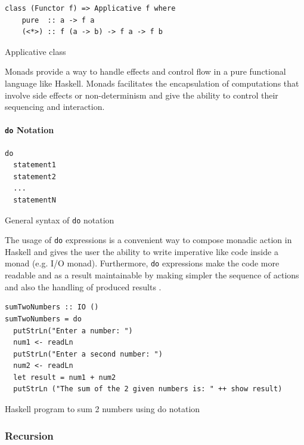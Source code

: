 \documentclass[a4paper, titlepage, twoside]{article}
\begin{document}
\begin{listing}[htbp]
\begin{verbatim}
class (Functor f) => Applicative f where
    pure  :: a -> f a
    (<*>) :: f (a -> b) -> f a -> f b
\end{verbatim}
\caption{Applicative class \autocite[chapter 29.1.1]{wikibooksHaskellWikibooksFree2022}}
\end{listing}

Monads provide a way to handle effects and control flow in a pure functional language like Haskell. Monads facilitates the encapsulation of computations that involve side effects or non-determinism and give the ability to control their sequencing and interaction.

\paragraph*{\texttt{do} Notation}
\label{sec:org20db2ad}

\begin{listing}[htbp]
\begin{verbatim}
do
  statement1
  statement2
  ...
  statementN
\end{verbatim}
\caption{General syntax of \texttt{do} notation}
\end{listing}

The usage of \texttt{do} expressions is a convenient way to compose monadic action in Haskell and gives the user the ability to write imperative like code inside a monad (e.g. I/O monad). Furthermore, \texttt{do} expressions make the code more readable and as a result maintainable by making simpler the sequence of actions and also the handling of produced results \autocite{kremerCPSC449Programming2015}.

\begin{listing}[htbp]
\begin{verbatim}
sumTwoNumbers :: IO ()
sumTwoNumbers = do
  putStrLn("Enter a number: ")
  num1 <- readLn
  putStrLn("Enter a second number: ")
  num2 <- readLn
  let result = num1 + num2
  putStrLn ("The sum of the 2 given numbers is: " ++ show result)
\end{verbatim}
\caption{Haskell program to sum 2 numbers using do notation \autocite[chapter 10.2]{wikibooksHaskellWikibooksFree2022}}
\end{listing}

\subsubsection{Recursion}
\label{sec:org3a6603e}
\end{document}
